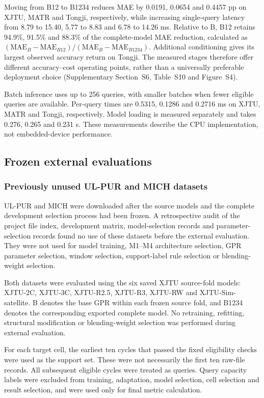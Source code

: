 \documentclass[preprint,12pt]{elsarticle}
\begin{document}
Moving from B12 to B1234 reduces MAE by 0.0191, 0.0654 and 0.4457 pp on XJTU, MATR and Tongji, respectively, while increasing single-query latency from 8.79 to 15.40, 5.77 to 8.83 and 6.78 to 14.26 ms. Relative to B, B12 retains 94.9\%, 91.5\% and 88.3\% of the complete-model MAE reduction, calculated as $(\mathrm{MAE}_B-\mathrm{MAE}_{B12})/(\mathrm{MAE}_B-\mathrm{MAE}_{B1234})$. Additional conditioning gives its largest observed accuracy return on Tongji. The measured stages therefore offer different accuracy--cost operating points, rather than a universally preferable deployment choice (Supplementary Section~S6, Table~S10 and Figure~S4).

Batch inference uses up to 256 queries, with smaller batches when fewer eligible queries are available. Per-query times are 0.5315, 0.1286 and 0.2716 ms on XJTU, MATR and Tongji, respectively. Model loading is measured separately and takes 0.276, 0.265 and 0.231 s. These measurements describe the CPU implementation, not embedded-device performance.

\subsection{Frozen external evaluations}
\label{sec:external}
\subsubsection{Previously unused UL-PUR and MICH datasets}
UL-PUR and MICH were downloaded after the source models and the complete development selection process had been frozen. A retrospective audit of the project file index, development matrix, model-selection records and parameter-selection records found no use of these datasets before the external evaluation. They were not used for model training, M1--M4 architecture selection, GPR parameter selection, window selection, support-label rule selection or blending-weight selection.

Both datasets were evaluated using the six saved XJTU source-fold models: XJTU-2C, XJTU-3C, XJTU-R2.5, XJTU-R3, XJTU-RW and XJTU-Sim-satellite. B denotes the base GPR within each frozen source fold, and B1234 denotes the corresponding exported complete model. No retraining, refitting, structural modification or blending-weight selection was performed during external evaluation.

For each target cell, the earliest ten cycles that passed the fixed eligibility checks were used as the support set. These were not necessarily the first ten raw-file records. All subsequent eligible cycles were treated as queries. Query capacity labels were excluded from training, adaptation, model selection, cell selection and result selection, and were used only for final metric calculation.
\end{document}
